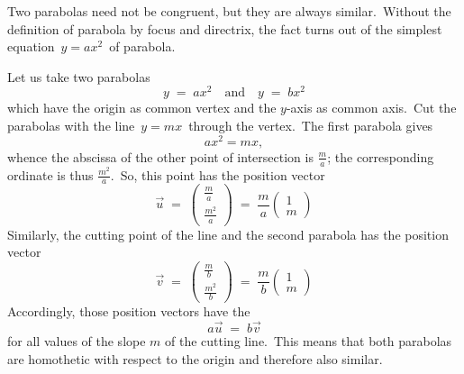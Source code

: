 \documentclass[12pt]{article}
\theoremstyle{definition}
\begin{document}
Two parabolas need not be congruent, but they are always similar.\, Without the definition of parabola by focus and directrix, the fact turns out of the simplest equation \,$y = ax^2$\, of parabola.

Let us take two parabolas
$$y \;=\; ax^2 \quad \mbox{and} \quad y \;=\; bx^2$$
which have the origin as common vertex and the $y$-axis as common axis.\, Cut the parabolas with the line \,$y = mx$\, through the vertex.\, The first parabola gives
$$ax^2 = mx,$$
whence the abscissa of the other point of intersection is $\frac{m}{a}$; the corresponding ordinate is thus
$\frac{m^2}{a}$.\, So, this point has the position vector
$$\vec{u} \;=\; \left(\!\begin{array}{c}\frac{m}{a}\\\frac{m^2}{a}\end{array}\!\right)
\;=\; \frac{m}{a}\left(\!\begin{array}{c}1\\m\end{array}\!\right)$$
Similarly, the cutting point of the line and the second parabola has the position vector
$$\vec{v} \;=\; \left(\!\begin{array}{c}\frac{m}{b}\\\frac{m^2}{b}\end{array}\!\right)
\;=\; \frac{m}{b}\left(\!\begin{array}{c}1\\m\end{array}\!\right)$$
Accordingly, those position vectors have the 
$$a\vec{u} \;=\; b\vec{v}$$
for all values of the slope $m$ of the cutting line.\, This means that both parabolas are homothetic with respect to the origin and therefore also similar. 


\end{document}
